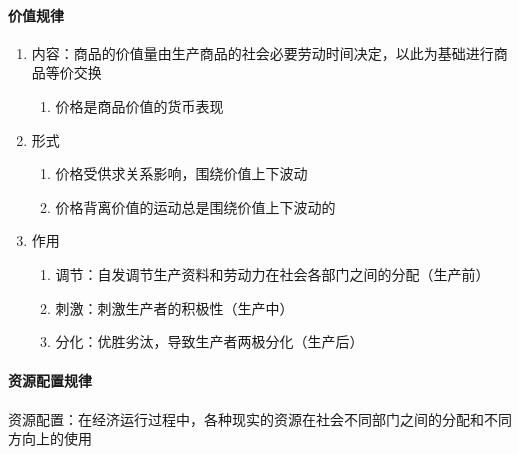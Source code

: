 \documentclass[12pt]{book}
\begin{document}
\paragraph{价值规律}


\begin{enumerate}
    \item 内容：商品的价值量由生产商品的社会必要劳动时间决定，以此为基础进行商品等价交换
          \begin{enumerate}[(1)]
              \item 价格是商品价值的货币表现
          \end{enumerate}
    \item 形式
          \begin{enumerate}[(1)]
              \item 价格受供求关系影响，围绕价值上下波动
              \item 价格背离价值的运动总是围绕价值上下波动的
          \end{enumerate}
    \item 作用
          \begin{enumerate}[(1)]
              \item 调节：自发调节生产资料和劳动力在社会各部门之间的分配（生产前）
              \item 刺激：刺激生产者的积极性（生产中）
              \item 分化：优胜劣汰，导致生产者两极分化（生产后）
          \end{enumerate}
\end{enumerate}








\paragraph{资源配置规律}



资源配置：在经济运行过程中，各种现实的资源在社会不同部门之间的分配和不同方向上的使用
\\
\end{document}
